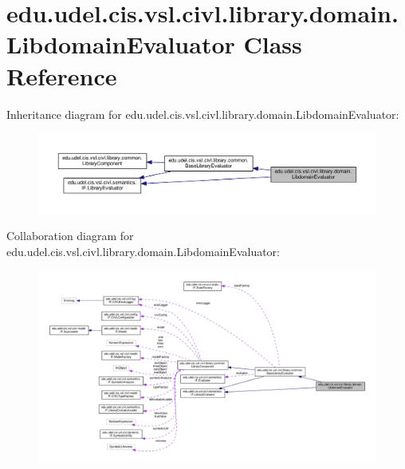 \hypertarget{classedu_1_1udel_1_1cis_1_1vsl_1_1civl_1_1library_1_1domain_1_1LibdomainEvaluator}{}\section{edu.\+udel.\+cis.\+vsl.\+civl.\+library.\+domain.\+Libdomain\+Evaluator Class Reference}
\label{classedu_1_1udel_1_1cis_1_1vsl_1_1civl_1_1library_1_1domain_1_1LibdomainEvaluator}


Inheritance diagram for edu.\+udel.\+cis.\+vsl.\+civl.\+library.\+domain.\+Libdomain\+Evaluator\+:
\nopagebreak
\begin{figure}[H]
\begin{center}
\leavevmode
\includegraphics[width=350pt]{classedu_1_1udel_1_1cis_1_1vsl_1_1civl_1_1library_1_1domain_1_1LibdomainEvaluator__inherit__graph}
\end{center}
\end{figure}


Collaboration diagram for edu.\+udel.\+cis.\+vsl.\+civl.\+library.\+domain.\+Libdomain\+Evaluator\+:
\nopagebreak
\begin{figure}[H]
\begin{center}
\leavevmode
\includegraphics[width=350pt]{classedu_1_1udel_1_1cis_1_1vsl_1_1civl_1_1library_1_1domain_1_1LibdomainEvaluator__coll__graph}
\end{center}
\end{figure}
